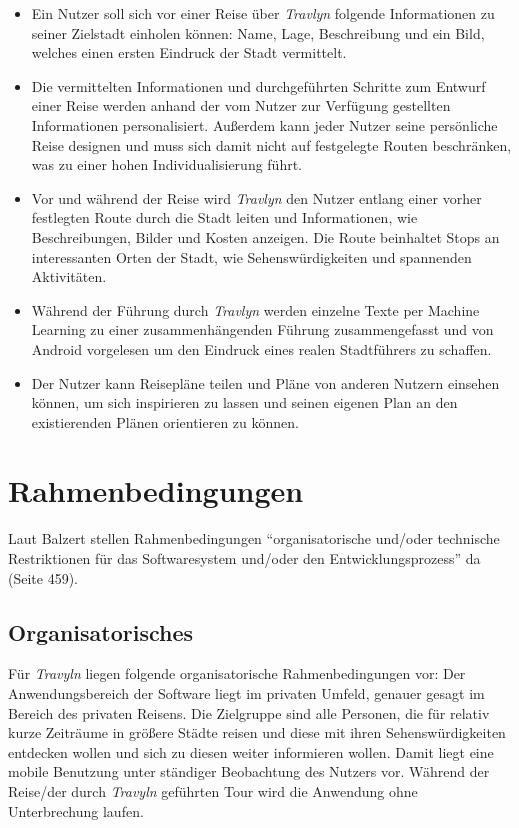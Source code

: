 \begin{itemize}
	\item Ein Nutzer soll sich vor einer Reise über \textit{Travlyn} folgende Informationen zu seiner Zielstadt einholen können: Name, Lage, Beschreibung und ein Bild, welches einen ersten Eindruck der Stadt vermittelt.
	\item Die vermittelten Informationen und durchgeführten Schritte zum Entwurf einer Reise werden anhand der vom Nutzer zur Verfügung gestellten Informationen personalisiert. Außerdem kann jeder Nutzer seine persönliche Reise designen und muss sich damit nicht auf festgelegte Routen beschränken, was zu einer hohen Individualisierung führt. 
	\item Vor und während der Reise wird \textit{Travlyn} den Nutzer entlang einer vorher festlegten Route durch die Stadt leiten und Informationen, wie Beschreibungen, Bilder und Kosten anzeigen. Die Route beinhaltet Stops an interessanten Orten der Stadt, wie Sehenswürdigkeiten und spannenden Aktivitäten.
	\item Während der Führung durch \textit{Travlyn} werden einzelne Texte per Machine Learning zu einer zusammenhängenden Führung zusammengefasst und von Android vorgelesen um den Eindruck eines realen Stadtführers zu schaffen.
	\item Der Nutzer kann Reisepläne teilen und Pläne von anderen Nutzern einsehen können, um sich inspirieren zu lassen und seinen eigenen Plan an den existierenden Plänen orientieren zu können. 
\end{itemize}

\section{Rahmenbedingungen}
Laut Balzert stellen Rahmenbedingungen \enquote{organisatorische und/oder technische Restriktionen für das Softwaresystem und/oder den Entwicklungsprozess} da \cite{Balzert.2009} (Seite 459).

\subsection{Organisatorisches}
Für \textit{Travyln} liegen folgende organisatorische Rahmenbedingungen vor: Der Anwendungsbereich der Software liegt im privaten Umfeld, genauer gesagt im Bereich des privaten Reisens. Die Zielgruppe sind alle Personen, die für relativ kurze Zeiträume in größere Städte reisen und diese mit ihren Sehenswürdigkeiten entdecken wollen und sich zu diesen weiter informieren wollen. Damit liegt eine mobile Benutzung unter ständiger Beobachtung des Nutzers vor. Während der Reise/der durch \textit{Travyln} geführten Tour wird die Anwendung ohne Unterbrechung laufen.


